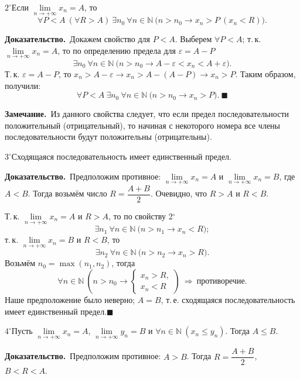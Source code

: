 \documentclass[a4paper,11pt]{article}
\newcommand{\zam}{\textbf{Замечание.}\ }
\newcommand{\dok}{\textbf{Доказательство.}\ }
\newcommand{\qedr}{\hfill$\blacksquare$}
\begin{document}
\begin{svoi}{$2^\circ$}Если $\lim\limits_{n \to +\infty} x_n = A$, то
\[
  \forall P < A\ (\forall R > A)\ \exists n_0\ \forall n \in \mathbb{N}\
  \big(n > n_0 \to x_n > P\ (x_n < R)\big).
\]
\end{svoi}

\dok Докажем свойство для $P < A$. Выберем $\forall P < A$; т.\,к.
$\lim\limits_{n \to +\infty} x_n = A$, то по определению предела для
$\varepsilon = A - P$
\[
  \exists n_0\ \forall n \in \mathbb{N}\ \big(n > n_0 \to A - \varepsilon < x_n < A + \varepsilon\big).
\]
Т.\,к. $\varepsilon = A - P$, то $x_n > A - \varepsilon \to x_n > A - (A - P)
\to x_n > P$. Таким образом, получили:
\[
  \forall P < A\ \exists n_0\ \forall n \in \mathbb{N}\ \big(n > n_0 \to x_n > P\big).\ \blacksquare
\]

\zam Из данного свойства следует, что если предел
последовательности положительный (отрицательный), то начиная с некоторого
номера все члены последовательности будут положительны (отрицательны).

\begin{svoi}{$3^\circ$}Сходящаяся последовательность имеет единственный предел.
\end{svoi}

\dok Предположим противное: $\lim\limits_{n \to +\infty} x_n = A$ и
$\lim\limits_{n \to +\infty} x_n = B$, где $A < B$. Тогда возьмём число
$R = \dfrac{A + B}{2}$. Очевидно, что $R > A$ и $R < B$.

Т.\,к. $\lim\limits_{n \to +\infty} x_n = A$ и $R > A$, то по свойству
2$^\circ$
\[
  \exists n_1\ \forall n \in \mathbb{N}\ \big(n > n_1 \to x_n < R\big);
\]
т.\,к. $\lim\limits_{n \to +\infty} x_n = B$ и $R < B$, то
\[
  \exists n_2\ \forall n \in \mathbb{N}\ \big(n > n_2 \to x_n > R\big).
\]
Возьмём $n_0 = \max(n_1, n_2)$, тогда
\[
  \forall n \in \mathbb{N}\ \left(n > n_0 \to
  \begin{cases} x_n > R,\\ x_n < R \end{cases}\right)
  \ \Longrightarrow\ \text{противоречие}.
\]
Наше предположение было неверно; $A = B$, т.\,е. сходящаяся
последовательность имеет единственный предел.\qedr

\begin{svoi}{$4^\circ$}Пусть $\lim\limits_{n \to +\infty} x_n = A$,
$\lim\limits_{n \to +\infty} y_n = B$ и $\forall n \in \mathbb{N}\ (x_n \le y_n)$.
Тогда $A \le B$.
\end{svoi}

\dok Предположим противное: $A > B$. Тогда $R = \dfrac{A + B}{2}$,
$B < R < A$.
\end{document}
